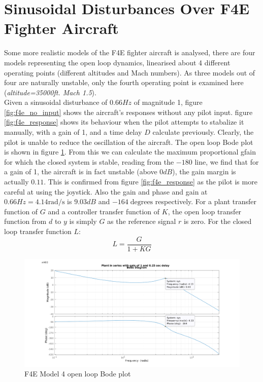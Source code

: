 \documentclass{article}
\begin{document}
\section{Sinusoidal Disturbances Over F4E Fighter Aircraft}

Some more realistic models of the F4E fighter aircraft is analysed, there are four models representing the open loop dynamics, linearised about 4 different operating points (different altitudes and Mach numbers). As three models out of four are naturally unstable, only the fourth operating point is examined here (\textit{altitude=35000ft. Mach 1.5}).\\
Given a sinusoidal disturbance of $0.66Hz$ of magnitude 1, figure \ref{fig:f4e_no_input} shows the aircraft's responses without any pilot input. figure \ref{fig:f4e_response} shows its behaviour when the pilot attempts to stabalize it manually, with a gain of 1, and a time delay $D$ calculate previously. Clearly, the pilot is unable to reduce the oscillation of the aircraft. The open loop Bode plot is shown in figure \ref{fig:f4e_bode}. From this we can calculate the maximum proportional gfain for which the closed system is stable, reading from the $-180$ line, we find that for a gain of 1, the aircraft is in fact unstable (above $0dB$), the gain margin is actually $0.11$. This is confirmed from figure \ref{fig:f4e_response} as the pilot is more careful at using the joystick. Also the gain and phase and gain at $0.66Hz=4.14\textrm{rad/s}$ is $9.03dB$ and $-164\; \textrm{degrees}$ respectively. For a plant transfer function of $G$ and a controller transfer function of $K$, the open loop transfer function from $d$ to $y$ is simply $G$ as the reference signal $r$ is zero. For the closed loop transfer function $L$:
\begin{equation}
	L = \dfrac{G}{1+KG}
\end{equation}
\begin{figure}[htp]
	\centering
	\includegraphics[width=\linewidth]{2_4_F4E_Model_4_Bode.png}
	\caption{F4E Model 4 open loop Bode plot}
	\label{fig:f4e_bode}
\end{figure}
\end{document}
